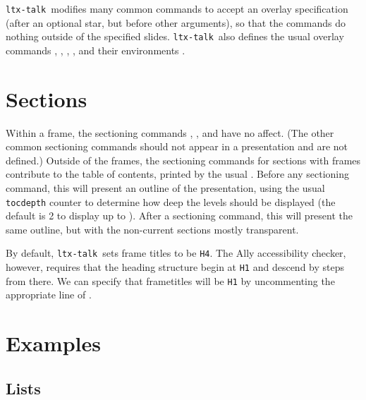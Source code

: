 \documentclass{ltugboat}
\newcommand{\ltxtalk}{\texttt{ltx-talk}}
\begin{document}
\ltxtalk\ modifies many common commands to accept an overlay specification
(after an optional star, but before other arguments),
so that the commands do nothing outside of the specified slides.
\ltxtalk\ also defines the usual overlay commands
, , , ,
and their environments .

\section{Sections}

Within a frame, the sectioning commands , , and
 have no affect.
(The other common sectioning commands should not appear in a presentation and
are not defined.)
Outside of the frames, the sectioning commands for sections with frames
contribute to the table of contents, printed by the usual .
Before any sectioning command,
this will present an outline of the presentation,
using the usual \texttt{tocdepth} counter to determine
how deep the levels should be displayed
(the default is 2 to display up to ).
After a sectioning command, this will present the same outline,
but with the non-current sections mostly transparent.

By default, \ltxtalk\ sets frame titles to be \texttt{H4}.
The Ally accessibility checker, however,
requires that the heading structure begin at \texttt{H1} and
descend by steps from there.
We can specify that frametitles will be \texttt{H1} by uncommenting
the appropriate line of .


\section{Examples}

\subsection{Lists}
\end{document}
